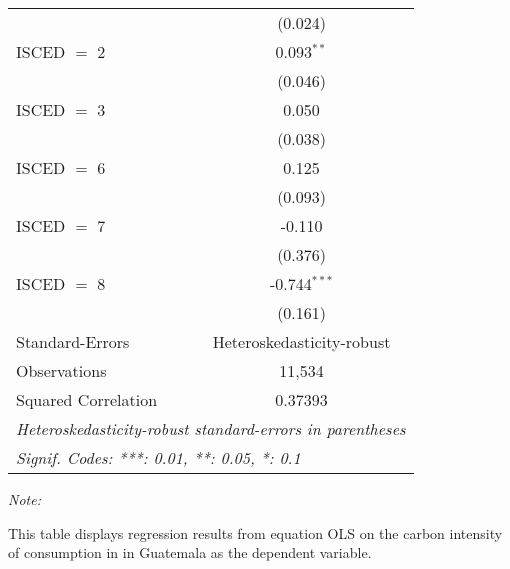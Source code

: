 \begin{table}[htbp!]
\begin{adjustbox}{width = 1\textwidth, max height = 0.95\textheight, center}
\begin{threeparttable}[b]
\begin{tabular}{lc}
                                & (0.024)\\   
            ISCED $=$ 2         & 0.093$^{**}$\\   
                                & (0.046)\\   
            ISCED $=$ 3         & 0.050\\   
                                & (0.038)\\   
            ISCED $=$ 6         & 0.125\\   
                                & (0.093)\\   
            ISCED $=$ 7         & -0.110\\   
                                & (0.376)\\   
            ISCED $=$ 8         & -0.744$^{***}$\\   
                                & (0.161)\\   
            \midrule 
            Standard-Errors     & Heteroskedasticity-robust \\   
            Observations        & 11,534\\  
            Squared Correlation & 0.37393\\  
            \midrule \midrule
            \multicolumn{2}{l}{\emph{Heteroskedasticity-robust standard-errors in parentheses}}\\
            \multicolumn{2}{l}{\emph{Signif. Codes: ***: 0.01, **: 0.05, *: 0.1}}\\
         \end{tabular}
         
         \begin{tablenotes}\item \medskip \textit{Note:}
            \item This table displays regression results from equation OLS on the carbon intensity of consumption in  in Guatemala as the dependent variable. 
         \end{tablenotes}
      \end{threeparttable}
   \end{adjustbox}
\end{table}


